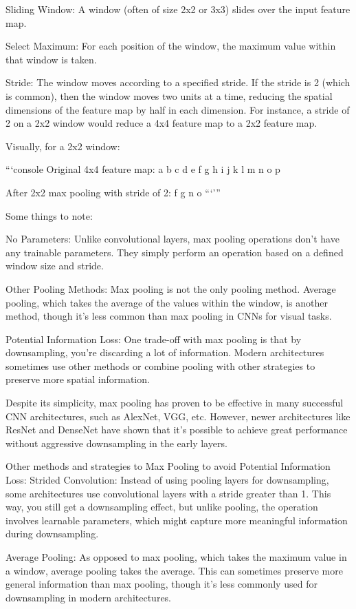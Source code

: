    Sliding Window: A window (often of size 2x2 or 3x3) slides over the input feature map.

    Select Maximum: For each position of the window, the maximum value within that window is taken.

    Stride: The window moves according to a specified stride. If the stride is 2 (which is common), then the window moves two units at a time, reducing the spatial dimensions of the feature map by half in each dimension. For instance, a stride of 2 on a 2x2 window would reduce a 4x4 feature map to a 2x2 feature map.

Visually, for a 2x2 window:

```console
Original 4x4 feature map:
a b c d
e f g h
i j k l
m n o p

After 2x2 max pooling with stride of 2:
f g
n o
```'''


Some things to note:

    No Parameters: Unlike convolutional layers, max pooling operations don’t have any trainable parameters. They simply perform an operation based on a defined window size and stride.

    Other Pooling Methods: Max pooling is not the only pooling method. Average pooling, which takes the average of the values within the window, is another method, though it’s less common than max pooling in CNNs for visual tasks.

    Potential Information Loss: One trade-off with max pooling is that by downsampling, you're discarding a lot of information. Modern architectures sometimes use other methods or combine pooling with other strategies to preserve more spatial information.

Despite its simplicity, max pooling has proven to be effective in many successful CNN architectures, such as AlexNet, VGG, etc. However, newer architectures like ResNet and DenseNet have shown that it's possible to achieve great performance without aggressive downsampling in the early layers.


Other methods and strategies to Max Pooling to avoid Potential Information Loss: 
    Strided Convolution: Instead of using pooling layers for downsampling, some architectures use convolutional layers with a stride greater than 1. This way, you still get a downsampling effect, but unlike pooling, the operation involves learnable parameters, which might capture more meaningful information during downsampling.

    Average Pooling: As opposed to max pooling, which takes the maximum value in a window, average pooling takes the average. This can sometimes preserve more general information than max pooling, though it's less commonly used for downsampling in modern architectures.


